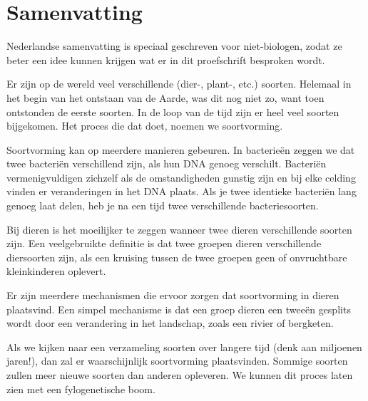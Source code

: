 \chapter*{Samenvatting}

{



\noindent 
{} Nederlandse samenvatting is speciaal geschreven
voor niet-biologen, zodat ze beter een idee kunnen
krijgen wat er in dit proefschrift besproken wordt.


Er zijn op de wereld veel verschillende (dier-, plant-, etc.) soorten.
Helemaal in het begin van het ontstaan van de Aarde, 
was dit nog niet zo, want toen ontstonden de eerste soorten.
In de loop van de tijd zijn er heel veel soorten bijgekomen.
Het proces die dat doet, noemen we soortvorming.


Soortvorming kan op meerdere manieren gebeuren.
In bacterieën zeggen we dat twee bacteriën verschillend zijn,
als hun DNA genoeg verschilt. Bacteriën vermenigvuldigen zichzelf
als de omstandigheden gunstig zijn en bij elke celding vinden
er veranderingen in het DNA plaats. Als je twee identieke bacteriën
lang genoeg laat delen, heb je na een tijd twee verschillende 
bacteriesoorten.


Bij dieren is het moeilijker te zeggen wanneer twee dieren
verschillende soorten zijn. Een veelgebruikte definitie is dat
twee groepen dieren verschillende diersoorten zijn, als een kruising
tussen de twee groepen geen of onvruchtbare kleinkinderen oplevert.

Er zijn meerdere mechanismen die ervoor zorgen 
dat soortvorming in dieren plaatsvind. 
Een simpel mechanisme is dat een groep dieren een tweeën gesplits
wordt door een verandering in het landschap, 
zoals een rivier of bergketen.


Als we kijken naar een verzameling soorten over langere tijd (denk
aan miljoenen jaren!), dan zal er waarschijnlijk 
soortvorming plaatsvinden. Sommige soorten zullen meer nieuwe soorten
dan anderen opleveren. We kunnen dit proces laten zien met een
fylogenetische boom.

}
